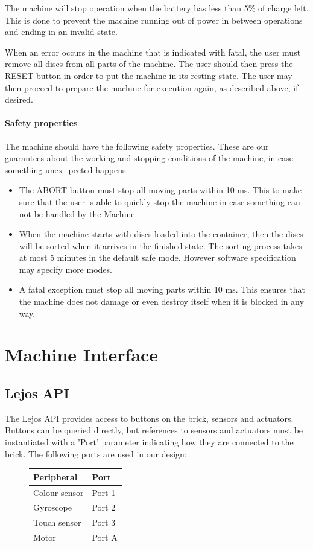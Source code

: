 \documentclass[a4paper,oneside,11pt]{article}
\begin{document}
The machine will stop operation when the battery has less than 5\% of charge left. This
is done to prevent the machine running out of power in between operations and ending in an
invalid state.

When an error occurs in the machine that is indicated with fatal, the user must remove all
discs from all parts of the machine. The user should then press the RESET button in order
to put the machine in its resting state. The user may then proceed to prepare the machine for
execution again, as described above, if desired.

\paragraph{Safety properties}
The machine should have the following safety properties. These are our
guarantees about the working and stopping conditions of the machine, in case something unex-
pected happens.

\begin{itemize}
	\item The ABORT button must stop all moving parts within 10 ms. This to make sure that the user is able to quickly stop the machine in case something can not be handled by the Machine.
	\item When the machine starts with discs loaded into the container, then the discs will be sorted
when it arrives in the finished state. The sorting process takes at most 5 minutes in the
default safe mode. However software specification may specify more modes.
	\item A fatal exception must stop all moving parts within 10 ms. This ensures that the machine
does not damage or even destroy itself when it is blocked in any way.
\end{itemize}

\section{Machine Interface}
\subsection{Lejos API}
The Lejos API provides access to buttons on the brick, sensors and actuators.
Buttons can be queried directly, but references to sensors and actuators must be instantiated
with a ’Port’ parameter indicating how they are connected to the brick. The following ports
are used in our design:

\begin{figure}[H]
\begin{tabular}{|l|l|}
\hline
\textbf{Peripheral} & \textbf{Port} \\
\hline
Colour sensor & Port 1 \\
Gyroscope & Port 2 \\
Touch sensor & Port 3 \\
Motor & Port A \\
\hline
\end{tabular}
\end{figure}
\end{document}
